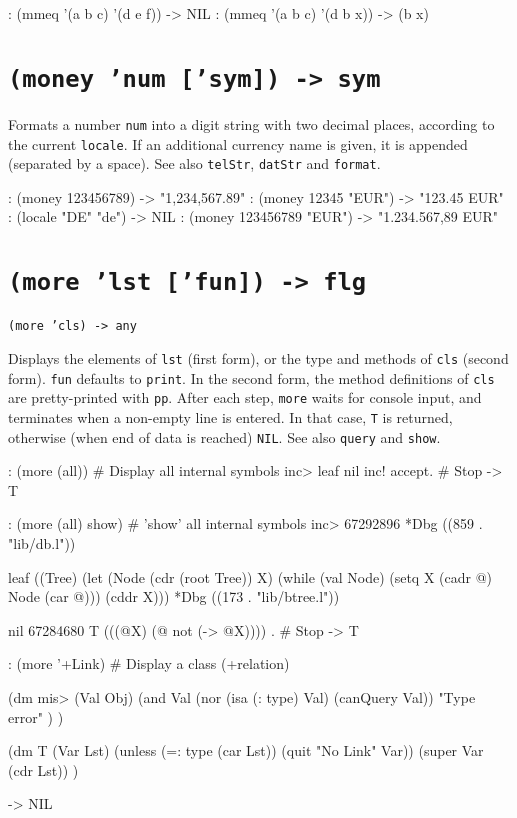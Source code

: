 \begin{wideverbatim}
: (mmeq '(a b c) '(d e f))
-> NIL
: (mmeq '(a b c) '(d b x))
-> (b x)
\end{wideverbatim}

 
\section*{\texttt{(money 'num ['sym]) -> sym}}
\label{sec:func-ref-M-(money 'num ['sym]) -> sym}


Formats a number \texttt{num} into a digit string with two decimal places,
according to the current \texttt{locale}. If an additional currency name is
given, it is appended (separated by a space). See also \texttt{telStr},
\texttt{datStr} and \texttt{format}.


\begin{wideverbatim}
: (money 123456789)
-> "1,234,567.89"
: (money 12345 "EUR")
-> "123.45 EUR"
: (locale "DE" "de")
-> NIL
: (money 123456789 "EUR")
-> "1.234.567,89 EUR"
\end{wideverbatim}

 
\section*{\texttt{(more 'lst ['fun]) -> flg}}
\label{sec:func-ref-M-(more 'lst ['fun]) -> flg}


\texttt{(more 'cls) -> any}

Displays the elements of \texttt{lst} (first form), or the type and methods of
\texttt{cls} (second form). \texttt{fun} defaults to \texttt{print}. In the second form, the
method definitions of \texttt{cls} are pretty-printed with \texttt{pp}. After each
step, \texttt{more} waits for console input, and terminates when a non-empty
line is entered. In that case, \texttt{T} is returned, otherwise (when end of
data is reached) \texttt{NIL}. See also \texttt{query} and \texttt{show}.


\begin{wideverbatim}
: (more (all))                         # Display all internal symbols
inc>
leaf
nil
inc!
accept.                                # Stop
-> T

: (more (all) show)                    # 'show' all internal symbols
inc> 67292896
   *Dbg ((859 . "lib/db.l"))

leaf ((Tree) (let (Node (cdr (root Tree)) X)
(while (val Node) (setq X (cadr @) Node (car @))) (cddr X)))
*Dbg ((173 . "lib/btree.l"))

nil 67284680
   T (((@X) (@ not (-> @X))))
.                                      # Stop
-> T

: (more '+Link)                        # Display a class
(+relation)

(dm mis> (Val Obj)
   (and
      Val
      (nor (isa (: type) Val) (canQuery Val))
      "Type error" ) )

(dm T (Var Lst)
   (unless (=: type (car Lst)) (quit "No Link" Var))
   (super Var (cdr Lst)) )

-> NIL
\end{wideverbatim}

